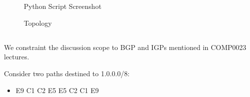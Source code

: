 \documentclass[12pt]{article}
\newcommand\twoitems[2]{%
\item#1%
\hspace{20pt}%
\labelitemi
\hspace{\labelsep}#2
}
\begin{document}
\newpage
\section{}

\renewcommand{\thesubsection}{\thesection.\alph{subsection}}

\subsection{}

\begin{figure}[h!]
  \caption{Python Script Screenshot}
  \label{fig:python-screenshot}
\end{figure}

\begin{figure}[h!]
  \caption{Topology}
  \label{fig:topology}
\end{figure}

\newpage
\subsection{}

We constraint the discussion scope to BGP and IGPs mentioned in COMP0023 lectures.

Consider two paths destined to 1.0.0.0/8:
\begin{itemize}
    \twoitems{E9 \textrightarrow{} C1 \textrightarrow{} C2 \textrightarrow{} E5}{E5 \textrightarrow{} C2 \textrightarrow{} C1 \textrightarrow{} E9}
\end{itemize}
\end{document}
